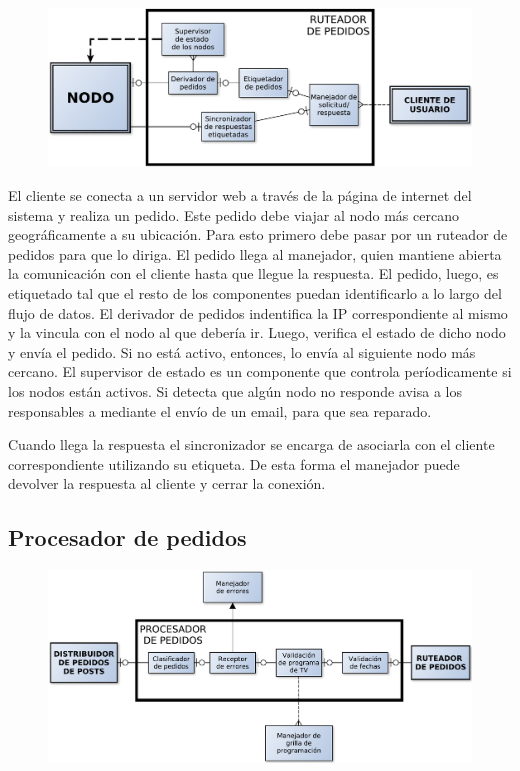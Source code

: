\begin{figure}[H]
\centering
\includegraphics[width=\textwidth]{graph/conector.pdf}
\end{figure}

El cliente se conecta a un servidor web a través de la página de internet del sistema y realiza un pedido. Este pedido debe viajar al nodo más cercano geográficamente a su ubicación. Para esto primero debe pasar por un ruteador de pedidos para que lo diriga.
El pedido llega al manejador, quien mantiene abierta la comunicación con el cliente hasta que llegue la respuesta. El pedido, luego, es etiquetado tal que el resto de los componentes puedan identificarlo a lo largo del flujo de datos. El derivador de pedidos indentifica la IP correspondiente al mismo y la vincula con el nodo al que debería ir. Luego, verifica el estado de dicho nodo y envía el pedido. Si no está activo, entonces, lo envía al siguiente nodo más cercano.
El supervisor de estado es un componente que controla períodicamente si los nodos están activos. Si detecta que algún nodo no responde avisa a los responsables a mediante el envío de un email, para que sea reparado.


Cuando llega la respuesta el sincronizador se encarga de asociarla con el cliente correspondiente utilizando su etiqueta. De esta forma el manejador puede devolver la respuesta al cliente y cerrar la conexión.

\subsection{Procesador de pedidos}

\begin{figure}[H]
\centering
\includegraphics[width=\textwidth]{graph/procpedidos.pdf}
\end{figure}


